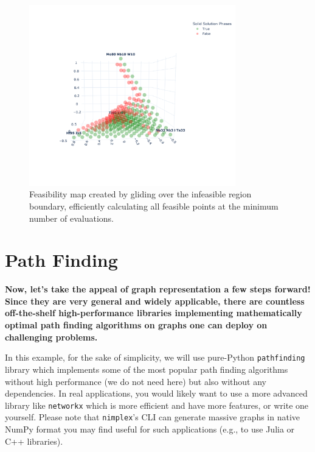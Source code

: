 \begin{figure}[H]
    \centering
    \includegraphics[width=0.8\textwidth]{nimplextutorial2/02.AdditiveManufacturingPathPlanning_40_1.pdf}
    \caption{Feasibility map created by gliding over the infeasible region boundary, efficiently calculating all feasible points at the minimum number of evaluations.}
    \label{nimplextutorial2:fig:infeasibilityglide}
\end{figure}

\section{Path Finding}\label{nimplextutorial2:path-finding}

\textbf{Now, let's take the appeal of graph representation a few steps
forward! Since they are very general and widely applicable, there are
countless off-the-shelf high-performance libraries implementing
mathematically optimal path finding algorithms on graphs one can deploy
on challenging problems.}

In this example, for the sake of simplicity, we will use pure-Python
\texttt{pathfinding} library which implements some of
the most popular path finding algorithms without high performance (we do
not need here) but also without any dependencies. In real applications,
you would likely want to use a more advanced library like
\texttt{networkx} which is more efficient and have more
features, or write one yourself. Please note that
\texttt{nimplex}'s CLI can generate massive graphs in
native NumPy format you may find useful for such applications (e.g., to
use Julia or C++ libraries).


